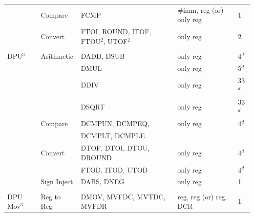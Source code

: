 \begin{table}
\begin{subtable}{\linewidth}
\begin{center}
\begin{tabular}{lllll}
                   & Compare            & FCMP                                   & \#imm, reg (or) only reg           & 1                        \\
                   & Convert            & FTOI, ROUND, ITOF, FTOU$^2$, UTOF$^2$  & only reg                           & 2                        \\
                   &                    &                                        &                                    &                          \\
DPU$^3$            & Arithmetic         & DADD, DSUB                             & only reg                           & 4$^d$                    \\
                   &                    & DMUL                                   & only reg                           & 5$^d$                    \\
                   &                    & DDIV                                   & only reg                           & 33$^d$                   \\
                   &                    & DSQRT                                  & only reg                           & 33$^d$                   \\
                   & Compare            & DCMPUN, DCMPEQ,                        & only reg                           & 4$^d$                    \\
                   &                    & DCMPLT, DCMPLE                         &                                    &                          \\
                   & Convert            & DTOF, DTOI, DTOU, DROUND               & only reg                           & 4$^d$                    \\
                   &                    & FTOD, ITOD, UTOD                       & only reg                           & 4$^d$                    \\
                   & Sign Inject        & DABS, DNEG                             & only reg                           & 1                        \\
                   &                    &                                        &                                    &                          \\
DPU Mov$^3$        & Reg to Reg         & DMOV, MVFDC, MVTDC, MVFDR              & reg, reg (or) reg, DCR             & 1                        \\

\end{tabular}
\end{center}
\end{subtable}
\end{table}
